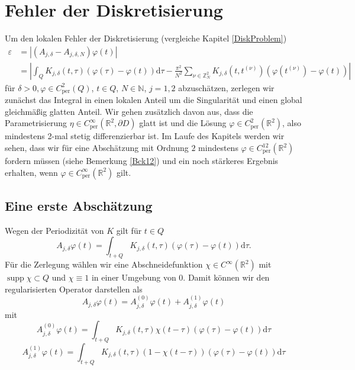 \documentclass[12pt,a4paper]{scrartcl}
\newcommand{\dd}{\mathrm{d}}
\numberwithin{equation}{section}
\newcommand{\R}{\mathbb{R}} %
\newcommand{\Z}{\mathbb{Z}} %
\newcommand{\N}{\mathbb{N}} %
\newcommand{\supp}{\operatorname{supp}}
\newcommand{\per}{\operatorname{per}}
\begin{document}
\section{Fehler der Diskretisierung} \label{chaDiskErr}
Um den lokalen Fehler der Diskretisierung (vergleiche Kapitel \ref{DiskProblem})
\begin{align*}
\varepsilon &= |(A_{j,\delta}-A_{j,\delta,N})\varphi(t)| \\
  &= |\int_Q K_{j,\delta}(t,\tau) (\varphi(\tau)- \varphi(t)) \dd \tau-\frac{\pi^2}{N^2}\sum_{\nu\in\Z_N^2}  K_{j,\delta}(t,t^{(\nu)}) \left(\varphi(t^{(\nu)})- \varphi(t)\right)|
\end{align*}
für $\delta>0, \varphi \in C_{\per}^2(Q)$, $t \in Q$, $N\in \N$, $j=1,2$ abzuschätzen, zerlegen wir zunächst das Integral in einen lokalen Anteil um die Singularität und einen global gleichmäßig glatten Anteil. Wir gehen zusätzlich davon aus, dass die Parametrisierung $\eta \in C_{\per}^\infty(\R^2,\partial D)$ glatt ist und die Lösung $\varphi\in C_{\per}^2(\R^2)$, also mindestens 2-mal stetig differenzierbar ist. Im Laufe des Kapitels werden wir sehen, dass wir für eine Abschätzung mit Ordnung $2$ mindestens $\varphi\in C_{\per}^{12}(\R^2)$ fordern müssen (siehe Bemerkung \ref{Bck12}) und ein noch stärkeres Ergebnis erhalten, wenn $\varphi\in C_{\per}^{\infty}(\R^2)$ gilt.
\subsection{Eine erste Abschätzung}
Wegen der Periodizität von $K$ gilt für $t \in Q$
\[
A_{j,\delta}\varphi(t) = \int_{t+Q} K_{j,\delta}(t,\tau) (\varphi(\tau)- \varphi(t)) \dd \tau.
\]
Für die Zerlegung wählen wir eine Abschneidefunktion $\chi \in C^\infty(\R^2)$ mit $\supp\chi \subset Q$ und $\chi \equiv 1$ in einer Umgebung von 0. Damit können wir den regularisierten Operator darstellen als
\[
A_{j,\delta}\varphi(t) = A^{(0)}_{j,\delta}\varphi(t) + A^{(1)}_{j,\delta}\varphi(t)
\] mit
\[
A^{(0)}_{j,\delta}\varphi(t)=\int_{t+Q} K_{j,\delta}(t,\tau)\chi(t-\tau)(\varphi(\tau)- \varphi(t)) \dd \tau
\]
\[
A^{(1)}_{j,\delta}\varphi(t)=\int_{t+Q} K_{j,\delta}(t,\tau)(1-\chi(t-\tau))(\varphi(\tau)- \varphi(t)) \dd \tau
\]
\end{document}
